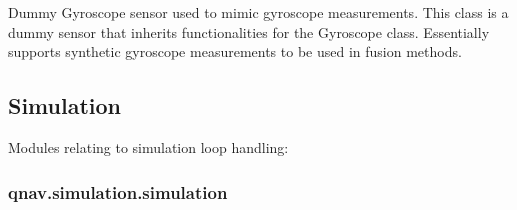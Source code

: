 \documentclass[letterpaper,10pt,english]{sphinxmanual}
\begin{document}

\begin{fulllineitems}
\label{\detokenize{modules/quantum/dummy:qnav.quantum.dummy.DummyGyroscope}}
\pysigstartsignatures
{}
\pysigstopsignatures
\sphinxAtStartPar
Dummy Gyroscope sensor used to mimic gyroscope measurements.
This class is a dummy sensor that inherits functionalities for the
Gyroscope class. Essentially supports synthetic gyroscope measurements
to be used in fusion methods.

\end{fulllineitems}



\subsection{Simulation}
\label{\detokenize{usage/packages:simulation}}
\sphinxAtStartPar
Modules relating to simulation loop handling:

\sphinxstepscope


\subsubsection{qnav.simulation.simulation}
\label{\detokenize{modules/simulation/simulation:module-qnav.simulation.simulation}}\label{\detokenize{modules/simulation/simulation:qnav-simulation-simulation}}\label{\detokenize{modules/simulation/simulation::doc}}
\end{document}
